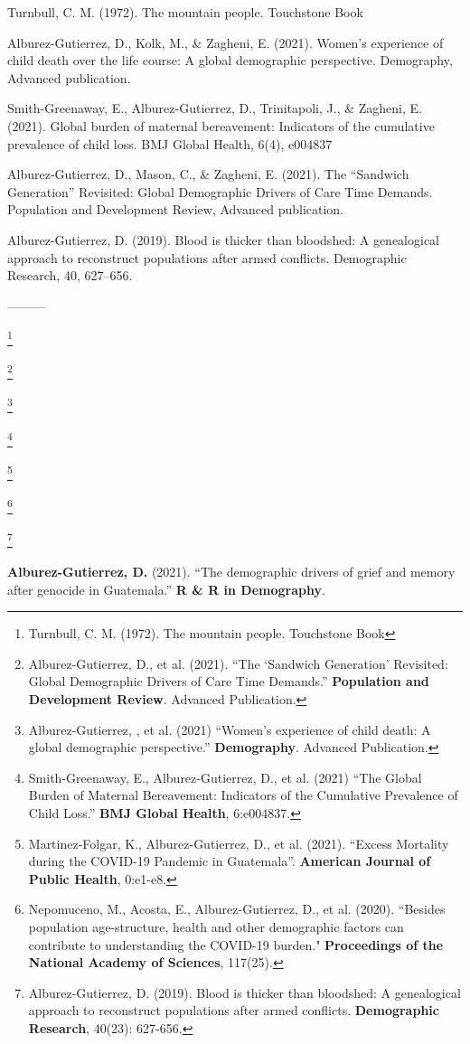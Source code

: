 Turnbull, C. M. (1972). The mountain people. Touchstone Book

Alburez-Gutierrez, D., Kolk, M., & Zagheni, E. (2021). Women’s experience of child death over the life course: A global demographic perspective. Demography, Advanced publication.

Smith-Greenaway, E., Alburez-Gutierrez, D., Trinitapoli, J., & Zagheni, E. (2021). Global burden of maternal bereavement: Indicators of the cumulative prevalence of child loss. BMJ Global Health, 6(4), e004837

Alburez-Gutierrez, D., Mason, C., & Zagheni, E. (2021). The “Sandwich Generation” Revisited: Global Demographic Drivers of Care Time Demands. Population and Development Review, Advanced publication.

Alburez-Gutierrez, D. (2019). Blood is thicker than bloodshed: A genealogical approach to reconstruct populations after armed conﬂicts. Demographic Research, 40, 627–656.

---------

\footnote{Turnbull, C. M. (1972). The mountain people. Touchstone Book}


\footnote{Alburez-Gutierrez, D., et al. (2021). ``The `Sandwich Generation' Revisited: Global Demographic Drivers of Care Time Demands.'' \textbf{Population and Development Review}. Advanced Publication.}

\footnote{Alburez-Gutierrez, , et al. (2021) ``Women's experience of child death: A global demographic perspective.'' \textbf{Demography}. Advanced Publication.}


\footnote{Smith-Greenaway, E., Alburez-Gutierrez, D., et al. (2021) ``The Global Burden of Maternal Bereavement: Indicators of the Cumulative Prevalence of Child Loss.'' \textbf{BMJ Global Health}, 6:e004837.}

\footnote{Martinez-Folgar, K., Alburez-Gutierrez, D., et al. (2021). ``Excess Mortality during the COVID-19 Pandemic in Guatemala''. \textbf{American Journal of Public Health}, 0:e1-e8.}

\footnote{Nepomuceno, M., Acosta, E., Alburez-Gutierrez, D., et al. (2020). ``Besides population age-structure, health and other demographic factors can contribute to understanding the COVID-19 burden." \textbf{Proceedings of the National Academy of Sciences}, 117(25).}



\footnote{Alburez-Gutierrez, D. (2019). Blood is thicker than bloodshed: A genealogical approach to reconstruct populations after armed conflicts. \textbf{Demographic Research}, 40(23): 627-656.}

\textbf{Alburez-Gutierrez, D.} (2021). ``The demographic drivers of grief and memory after genocide in Guatemala.'' \textbf{R \& R in Demography}.
